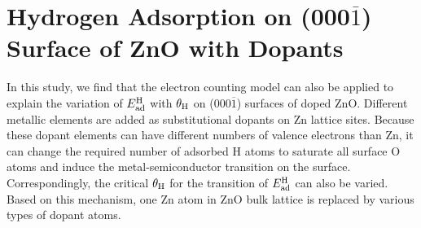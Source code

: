 \section{Hydrogen Adsorption on (000$\overline{1}$) Surface of ZnO with Dopants}
\label{sec:doped}

In this study, we find that the electron counting model can also be applied to explain the variation of $E_{\textup{ad}}^{\textup{H}}$ with $\theta_{\textup{H}}$ on (000$\overline{1}$) surfaces of doped ZnO\cite{pashley1989electron}. Different metallic elements are added as substitutional dopants on Zn lattice sites. Because these dopant elements can have different numbers of valence electrons than Zn, it can change the required number of adsorbed H atoms to saturate all surface O atoms and induce the metal-semiconductor transition on the surface. Correspondingly, the critical $\theta_{\textup{H}}$ for the transition of $E_{\textup{ad}}^{\textup{H}}$ can also be varied.  Based on this mechanism, one Zn atom in ZnO bulk lattice is replaced by various types of dopant atoms.

